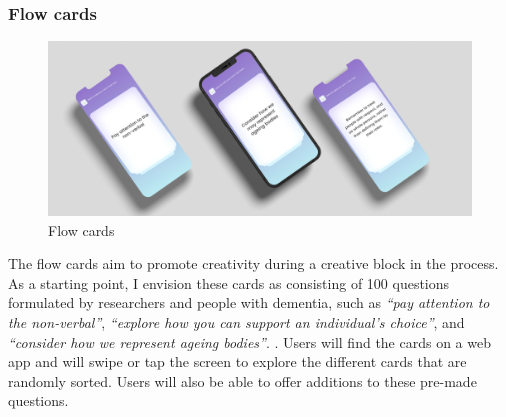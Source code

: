 \subsubsection{Flow cards}
\begin{figure}[h]
\centering
\includegraphics[width=1\linewidth]{Images/D3Toolkit/Fig8.png}
\caption{Flow cards}
\label{fig:FlowCards}
\end{figure}
The flow cards aim to promote creativity during a creative block in the process. As a starting point, I envision these cards as consisting of 100 questions formulated by researchers and people with dementia, such as \textit{``pay attention to the non-verbal''}, \textit{``explore how you can support an individual’s choice''}, and \textit{``consider how we represent ageing bodies''}. . Users will find the cards on a web app and will swipe or tap the screen to explore the different cards that are randomly sorted. Users will also be able to offer additions to these pre-made questions. 

